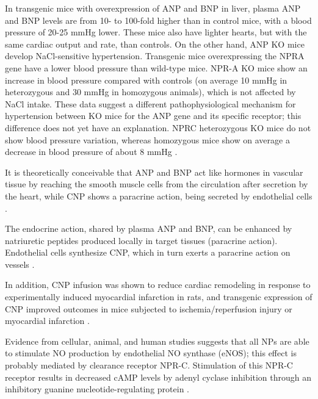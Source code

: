 \documentclass[14pt,a4paper,onecolumn]{extarticle}
\begin{document}
In transgenic mice with overexpression of ANP and BNP in liver, plasma ANP and BNP levels are from 10- to 100-fold higher than in control mice, with a blood pressure of 20-25 mmHg lower. These mice also have lighter hearts, but with the same cardiac output and rate, than controls.  On the other hand, ANP KO mice develop NaCl-sensitive hypertension. Transgenic mice overexpressing the NPRA gene have  a lower blood pressure than wild-type mice. NPR-A KO mice show an increase in blood pressure compared with controls (on average 10 mmHg in heterozygous and 30 mmHg in homozygous animals), which is not affected by NaCl intake. These data suggest a different pathophysiological mechanism for hypertension between KO mice for the ANP gene and its specific receptor; this difference does not yet have an explanation. NPRC heterozygous KO mice do not show blood pressure variation, whereas homozygous mice show on average a decrease in blood pressure of about 8 mmHg \citep{251}.


It is theoretically conceivable that ANP and BNP act like hormones in vascular tissue by reaching the smooth muscle cells from the circulation after secretion by the heart, while CNP shows a paracrine action, being secreted by endothelial cells \citep{57} \citep{bib2120} \citep{88}. %

The endocrine action, shared by plasma ANP and BNP, can be enhanced by natriuretic peptides produced locally in target tissues (paracrine action). Endothelial cells synthesize CNP, which in turn exerts a paracrine action on vessels \citep{88}.

In addition, CNP infusion was shown to reduce cardiac remodeling in response to experimentally induced myocardial infarction in rats, and transgenic expression of CNP improved outcomes in mice subjected to ischemia/reperfusion injury or myocardial infarction \citep{Wang2007}. %

Evidence from cellular, animal, and human studies suggests that all NPs are able to stimulate NO production by endothelial NO synthase (eNOS); this effect is probably mediated by clearance receptor NPR-C. Stimulation of this NPR-C receptor results in decreased cAMP levels by adenyl cyclase inhibition through an inhibitory guanine nucleotide-regulating protein \citep{270}.
\end{document}
